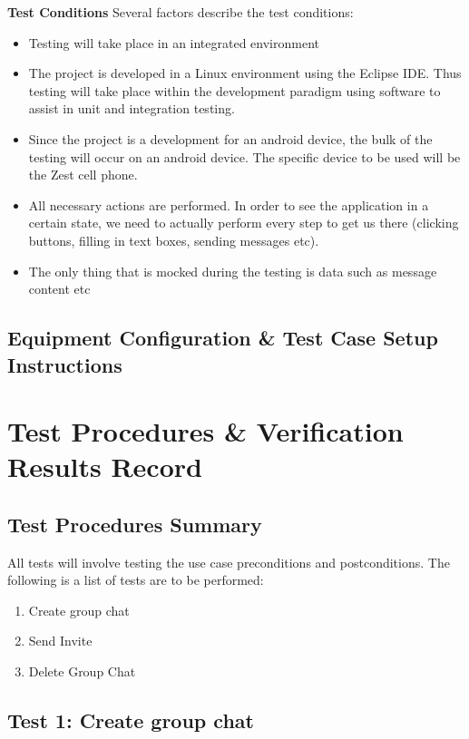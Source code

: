 \documentclass[11pt]{article}
\begin{document}
\textbf{Test Conditions}
Several factors describe the test conditions:
\begin{itemize}
\item Testing will take place in an integrated environment
\item The project is developed in a Linux environment using the Eclipse IDE. Thus testing will take place within the development paradigm using software to assist in unit and integration testing.
\item Since the project is a development for an android device, the bulk of the testing will occur on an android device. The specific device to be used will be the Zest cell phone.
\item All necessary actions are performed. In order to see the application in a certain state, we need to actually perform every step to get us there (clicking buttons, filling in text boxes, sending messages etc).
\item The only thing that is mocked during the testing is data such as message content etc
\end{itemize}



\subsection{Equipment Configuration \& Test Case Setup Instructions}


\section{Test Procedures \& Verification Results Record}
\subsection{Test Procedures Summary}
All tests will involve testing the use case preconditions and postconditions.
The following is a list of tests are to be performed:
\begin{enumerate}
\item Create group chat
\item Send Invite
\item Delete Group Chat
\end{enumerate}



\subsection{Test 1: Create group chat}
\end{document}
